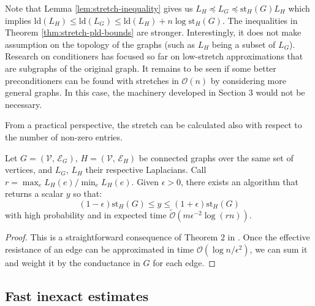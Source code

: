Note that Lemma \ref{lem:stretch-inequality} gives us $L_{H}\preceq L_{G}\preceq\text{st}_{H}\left(G\right)L_{H}$
which implies $\text{ld}\left(L_{H}\right)\leq\text{ld}\left(L_{G}\right)\leq\text{ld}\left(L_{H}\right)+n\log\text{st}_{H}\left(G\right)$.
The inequalities in Theorem \ref{thm:stretch-pld-bounds} are stronger.
Interestingly, it does not make assumption on the topology of the
graphs (such as $L_{H}$ being a subset of $L_{G}$). Research on
conditioners has focused so far on low-stretch approximations that
are subgraphs of the original graph. It remains to be seen if some
better preconditioners can be found with stretches in $\mathcal{O}\left(n\right)$
by considering more general graphs. In this case, the machinery developed
in Section 3 would not be necessary.

From a practical perspective, the stretch can be calculated also with
respect to the number of non-zero entries. 
\begin{lemma}
\label{lem:stretch-approx}Let $G=\left(\mathcal{V},\,\mathcal{E}_{G}\right),\, H=\left(\mathcal{V},\,\mathcal{E}_{H}\right)$
be connected graphs over the same set of vertices, and $L_{G}$, $L_{H}$
their respective Laplacians. Call $r=\max_{e}L_{H}\left(e\right)/\min_{e}L_{H}\left(e\right)$.
Given $\epsilon>0$, there exists an algorithm that returns a scalar
$y$ so that: 
\[
\left(1-\epsilon\right)\text{st}_{H}\left(G\right)\leq y\leq\left(1+\epsilon\right)\text{st}_{H}\left(G\right)
\]
with high probability and in expected time $\tilde{\mathcal{O}}\left(m\epsilon^{-2}\log\left(rn\right)\right)$.\end{lemma}
\begin{proof}
This is a straightforward consequence of Theorem $2$ in \cite{Spielman2009}.
Once the effective resistance of an edge can be approximated in time
$\mathcal{O}\left(\log n/\epsilon^{2}\right)$, we can sum it and
weight it by the conductance in $G$ for each edge. 
\end{proof}

\subsection{Fast inexact estimates}


